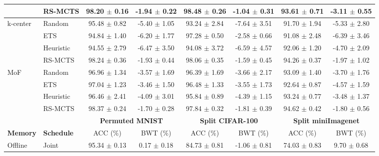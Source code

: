 \begin{tabular}{llcccccc}
	& RS-MCTS            & 98.20 $\pm$ 0.16      & -1.94 $\pm$ 0.22     & 98.48 $\pm$ 0.26         & -1.04 $\pm$ 0.31         & 93.61 $\pm$ 0.71       & -3.11 $\pm$ 0.55       \\ \midrule
	\multirow{4}{*}{k-center} & Random          & 95.48 $\pm$ 0.82      & -5.40 $\pm$ 1.05     & 93.24 $\pm$ 2.84         & -7.64 $\pm$ 3.51         & 91.70 $\pm$ 1.94       & -5.33 $\pm$ 2.80       \\
	& ETS             & 94.84 $\pm$ 1.40      & -6.20 $\pm$ 1.77     & 97.28 $\pm$ 0.50         & -2.58 $\pm$ 0.66         & 91.08 $\pm$ 2.48       & -6.39 $\pm$ 3.46       \\
	& Heuristic         & 94.55 $\pm$ 2.79      & -6.47 $\pm$ 3.50     & 94.08 $\pm$ 3.72         & -6.59 $\pm$ 4.57         & 92.06 $\pm$ 1.20       & -4.70 $\pm$ 2.09       \\
	& RS-MCTS            & 98.24 $\pm$ 0.36      & -1.93 $\pm$ 0.44     & 98.06 $\pm$ 0.35         & -1.59 $\pm$ 0.45         & 94.26 $\pm$ 0.37       & -1.97 $\pm$ 1.02       \\ \midrule
	\multirow{4}{*}{MoF}             & Random          & 96.96 $\pm$ 1.34      & -3.57 $\pm$ 1.69     & 96.39 $\pm$ 1.69         & -3.66 $\pm$ 2.17         & 93.09 $\pm$ 1.40       & -3.70 $\pm$ 1.76       \\
	& ETS             & 97.04 $\pm$ 1.23      & -3.46 $\pm$ 1.50     & 96.48 $\pm$ 1.33         & -3.55 $\pm$ 1.73         & 92.64 $\pm$ 0.87       & -4.57 $\pm$ 1.59       \\
	& Heuristic         & 96.46 $\pm$ 2.41      & -4.09 $\pm$ 3.01     & 95.84 $\pm$ 0.89         & -4.39 $\pm$ 1.15         & 93.24 $\pm$ 0.77       & -3.48 $\pm$ 1.37       \\
	& RS-MCTS            & 98.37 $\pm$ 0.24      & -1.70 $\pm$ 0.28     & 97.84 $\pm$ 0.32         & -1.81 $\pm$ 0.39         & 94.62 $\pm$ 0.42       & -1.80 $\pm$ 0.56       \\ 
	\bottomrule
	\toprule
	&         & \multicolumn{2}{c}{\textbf{Permuted MNIST}} & \multicolumn{2}{c}{\textbf{Split CIFAR-100}} & \multicolumn{2}{c}{\textbf{Split miniImagenet}} \\ \midrule 
	\textbf{Memory}                 & \textbf{Schedule}  & ACC (\%)        & BWT (\%)         & ACC (\%)         & BWT (\%)         & ACC (\%)          & BWT (\%)           \\ \midrule 
	Offline                   & Joint   & 95.34 $\pm$ 0.13  & 0.17 $\pm$ 0.18    & 84.73 $\pm$ 0.81   & -1.06 $\pm$ 0.81   & 74.03 $\pm$ 0.83    & 9.70 $\pm$ 0.68      \\ \midrule 

\end{tabular}
